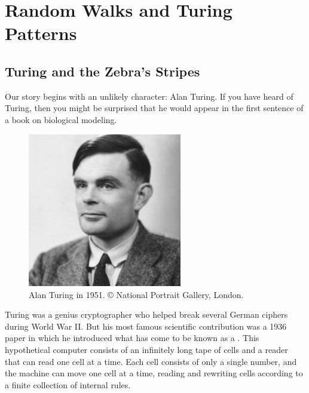 \chapter[Random Walks and Turing Patterns]{Random Walks and Turing Patterns}
\label{chapter:turing}
\renewcommand{\chaptertitle}{Finding Motifs in Transcription Factor Networks}


\FloatBarrier

\section{Turing and the Zebra’s Stripes}
\label{sec:introduction}

Our story begins with an unlikely character: Alan Turing. If you have heard of Turing, then you might be surprised that he would appear in the first sentence of a book on biological modeling.

\begin{figure}[h]
\centering
\mySfFamily
\includegraphics[width = 0.6\textwidth]{../images/alan_turing_npg_cc.jpg}
\caption{Alan Turing in 1951. © National Portrait Gallery, London.}
\label{fig:alan_turing_npg_cc}
\end{figure}

Turing was a genius cryptographer who helped break several German ciphers during World War II. But his most famous scientific contribution was a 1936 paper in which he introduced what has come to be known as a . This hypothetical computer consists of an infinitely long tape of cells and a reader that can read one cell at a time. Each cell consists of only a single number, and the machine can move one cell at a time, reading and rewriting cells according to a finite collection of internal rules.

